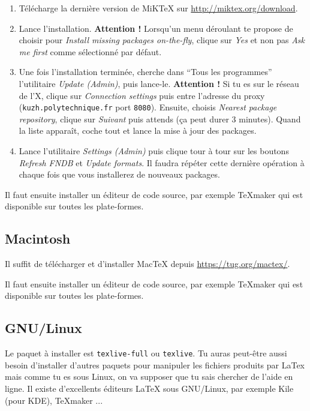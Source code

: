 \documentclass[a4paper,12pt,twoside]{article}
\begin{document}
\begin{enumerate}
	\item Télécharge la dernière version de MiKTeX sur \url{http://miktex.org/download}.
	\item Lance l'installation. \textbf{Attention !} Lorsqu'un menu déroulant te propose de choisir pour \emph{Install missing packages on-the-fly}, clique sur \emph{Yes} et non pas \emph{Ask me first} comme sélectionné par défaut.
	\item Une fois l'installation terminée, cherche dans \enquote{Tous les programmes} l'utilitaire \emph{Update (Admin)}, puis lance-le. \textbf{Attention !} Si tu es sur le réseau de l'X, clique sur \emph{Connection settings} puis entre l'adresse du proxy (\texttt{kuzh.polytechnique.fr} port \texttt{8080}). Ensuite, choisis \emph{Nearest package repository}, clique sur \emph{Suivant} puis attends (ça peut durer 3 minutes). Quand la liste apparaît, coche tout et lance la mise à jour des packages.
	\item Lance l'utilitaire \emph{Settings (Admin)} puis clique tour à tour sur les boutons \emph{Refresh FNDB} et \emph{Update formats}. Il faudra répéter cette dernière opération à chaque fois que vous installerez de nouveaux packages.
\end{enumerate}

Il faut ensuite installer un éditeur de code source, par exemple TeXmaker qui est disponible sur toutes les plate-formes.

\subsection{Macintosh}

Il suffit de télécharger et d'installer MacTeX depuis \url{https://tug.org/mactex/}. 

Il faut ensuite installer un éditeur de code source, par exemple TeXmaker qui est disponible sur toutes les plate-formes.

\subsection{GNU/Linux}

Le paquet à installer est \texttt{texlive-full} ou \texttt{texlive}. Tu auras peut-être aussi besoin d'installer d'autres paquets pour manipuler les fichiers produits par LaTex mais comme tu es sous Linux, on va supposer que tu sais chercher de l'aide en ligne. Il existe d'excellents éditeurs LaTeX sous GNU/Linux, par exemple Kile (pour KDE), TeXmaker ...
\end{document}
